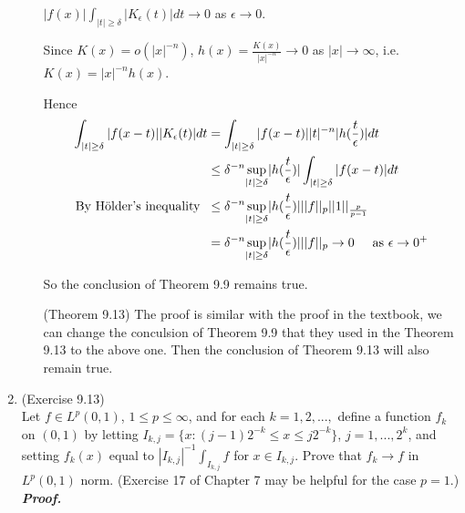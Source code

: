 \documentclass[a4paper,11pt]{article}
\begin{document}
\begin{enumerate}
\begin{enumerate}
			$|f(x)| \int_{|t| \geq \delta} |K_\epsilon (t)| dt \to 0$ as $\epsilon \to 0$.\

			Since $K(x) = o(|x|^{-n})$, $h(x) = \frac{K(x)}{|x|^{-n}} \to 0$ as $|x| \to \infty$, i.e. $K(x) = |x|^{-n} h(x)$.\

			Hence
				$$\begin{aligned}
				\int_{|t| \geq \delta} |f(x-t)| |K_\epsilon (t)| dt
				&= \int_{|t| \geq \delta} |f(x-t)| |t|^{-n} |h(\frac{t}{\epsilon})| dt\\
				&\leq \delta^{-n} \underset{|t| \geq \delta}{\sup} |h(\frac{t}{\epsilon})| \int_{|t| \geq \delta} |f(x-t)| dt\\
				\text{By H$\ddot{\text{o}}$lder's inequality} \hspace{0.2cm}
				&\leq \delta^{-n} \underset{|t| \geq \delta}{\sup} |h(\frac{t}{\epsilon})| ||f||_p ||1||_{\frac{p}{p-1}}\\
				&= \delta^{-n} \underset{|t| \geq \delta}{\sup} |h(\frac{t}{\epsilon})| ||f||_p \to 0
				\hspace{0.5cm} \text{as $\epsilon \to 0^+$}
				\end{aligned}$$

			So the conclusion of Theorem 9.9 remains true.\\

		\item [(Theorem 9.13)]
			The proof is similar with the proof in the textbook, we can change the conculsion of Theorem 9.9 that they used in the Theorem 9.13 to the above one. Then the conclusion of Theorem 9.13 will also remain true.\\
	\end{enumerate}

	\item (Exercise 9.13)\\ 
		Let $f \in L^p(0,1)$, $1 \leq p \leq \infty$, and for each $k = 1,2,...,$ define a function $f_k$ on $(0,1)$ by letting $I_{k,j} = \{x : (j-1) 2^{-k} \leq x \leq j 2^{-k} \}$, $j = 1,...,2^k$, and setting $f_k(x)$ equal to $|I_{k,j}|^{-1} \int_{I_{k,j}} f$ for $x \in I_{k,j}$. Prove that $f_k \to f$ in $L^p(0,1)$ norm. (Exercise 17 of Chapter 7 may be helpful for the case $p = 1$.)\\
	\newline
	\textit{\textbf {Proof.}}\\


\end{enumerate}
\end{document}

